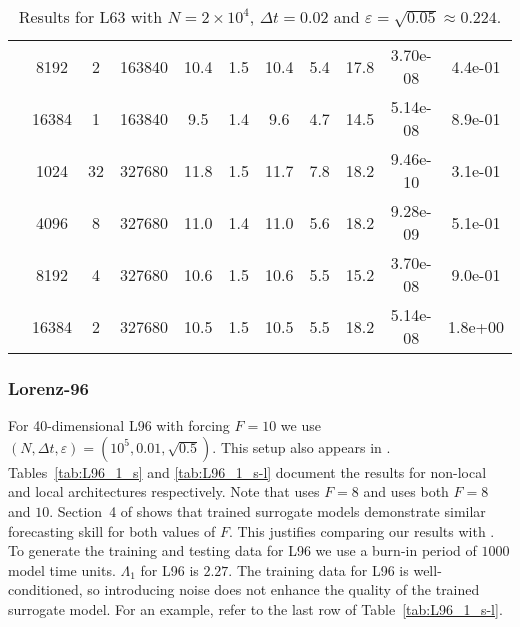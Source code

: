 \begin{table}[!htp]
\begin{tabular}{|c|c|c|c|c|c|c|c|c|c|c|}
 & 8192 & 2 & 163840 & 10.4 & 1.5 & 10.4 & 5.4 & 17.8 & 3.70e-08 & 4.4e-01\\ \cline{2-11}
 & 16384 & 1 & 163840 & 9.5 & 1.4 & 9.6 & 4.7 & 14.5 & 5.14e-08 & 8.9e-01\\ \cline{2-11}
 & \cellcolor{pink}1024 & \cellcolor{pink}32 & \cellcolor{pink}327680 & \cellcolor{pink}11.8 & \cellcolor{pink}1.5 & \cellcolor{pink}11.7 & \cellcolor{pink}7.8 & \cellcolor{pink}18.2 & \cellcolor{pink}9.46e-10 & \cellcolor{pink}3.1e-01\\ \cline{2-11}
 & 4096 & 8 & 327680 & 11.0 & 1.4 & 11.0 & 5.6 & 18.2 & 9.28e-09 & 5.1e-01\\ \cline{2-11}
 & 8192 & 4 & 327680 & 10.6 & 1.5 & 10.6 & 5.5 & 15.2 & 3.70e-08 & 9.0e-01\\ \cline{2-11}
 & 16384 & 2 & 327680 & 10.5 & 1.5 & 10.5 & 5.5 & 18.2 & 5.14e-08 & 1.8e+00\\ \cline{2-11}
\cline{1-2}
\end{tabular}
    \caption{Results for L63 with $N=2\times10^4$, $\Delta t=0.02$ and $\varepsilon=\sqrt{0.05}\approx0.224$.}
    \label{tab:L63_0_s}
\end{table}

\subsubsection{Lorenz-96}\label{ssec:ap-L96}
For 40-dimensional L96 with forcing $F=10$ we use $(N, \Delta t, \varepsilon) = (10^5, 0.01, \sqrt{0.5})$. This setup also appears in \cite{platt2022systematic, vlachas2020backpropagation}. Tables~\ref{tab:L96_1_s} and \ref{tab:L96_1_s-l}  document the results for non-local and local architectures respectively. Note that \cite{platt2022systematic} uses $F=8$ and \cite{vlachas2020backpropagation} uses both $F=8$ and $10$. Section~4 of \cite{vlachas2020backpropagation} shows that trained surrogate models demonstrate similar forecasting skill for both values of $F$. This justifies comparing our results with \cite{ platt2022systematic, vlachas2020backpropagation}. To generate the training and testing data for L96 we use a burn-in period of $1000$ model time units. $\Lambda_1$ for L96 is $2.27$. The training data for L96 is well-conditioned, so introducing noise does not enhance the quality of the trained surrogate model. For an example, refer to the last row of Table~\ref{tab:L96_1_s-l}.

